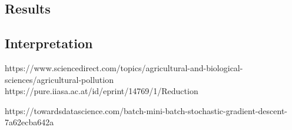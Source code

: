 \subsection{Results}
\subsection{Interpretation}

https://www.sciencedirect.com/topics/agricultural-and-biological-sciences/agricultural-pollution 
https://pure.iiasa.ac.at/id/eprint/14769/1/Reduction%

https://towardsdatascience.com/batch-mini-batch-stochastic-gradient-descent-7a62ecba642a